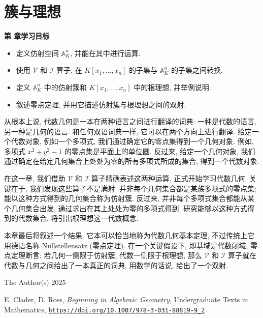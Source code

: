 \chapter{簇与理想}\label{chap:varieties-and-ideals}

\noindent\textbf{第 \thechapter{} 章学习目标}
\begin{itemize}
  \item 定义仿射空间 $\mathbb{A}^{n}_{K}$, 并能在其中进行运算.
  \item 使用 $\mathcal{V}$ 和 $\mathcal{I}$ 算子, 在 $K[x_{1},\ldots,x_{n}]$ 的子集与 $\mathbb{A}^{n}_{K}$ 的子集之间转换.
  \item 定义 $\mathbb{A}^{n}_{K}$ 中的仿射簇和 $K[x_{1},\ldots,x_{n}]$ 中的根理想, 并举例说明.
  \item 叙述零点定理, 并用它描述仿射簇与根理想之间的双射.
\end{itemize}

从根本上说, 代数几何是一本在两种语言之间进行翻译的词典: 一种是代数的语言, 另一种是几何的语言. 和任何双语词典一样, 它可以在两个方向上进行翻译. 给定一个代数对象, 例如一个多项式, 我们通过确定它的零点集得到一个几何对象. 例如, 多项式 $x^{2}+y^{2}-1$ 的零点集是平面上的单位圆. 反过来, 给定一个几何对象, 我们通过确定在给定几何集合上处处为零的所有多项式所成的集合, 得到一个代数对象.

在这一章, 我们借助 $\mathcal{V}$ 和 $\mathcal{I}$ 算子精确表述这两种运算, 正式开始学习代数几何. 关键在于, 我们发现这些算子不是满射. 并非每个几何集合都是某族多项式的零点集; 能以这种方式得到的几何集合称为仿射簇. 反过来, 并非每个多项式集合都能从某个几何集合出发, 通过求出在其上处处为零的多项式得到. 研究能够以这种方式得到的代数集合, 将引出根理想这一代数概念.

本章最后将叙述一个结果. 它本可以恰当地称为\textquotedbl{}代数几何基本定理\textquotedbl{}, 不过传统上它用德语名称 Nullstellensatz (零点定理). 在一个关键假设下, 即基域是代数闭域, 零点定理断言: 若几何一侧限于仿射簇, 代数一侧限于根理想, 那么 $\mathcal{V}$ 和 $\mathcal{I}$ 算子就在代数与几何之间给出了一本真正的词典, 用数学的话说, 给出了一个双射.

\par\smallskip
{\footnotesize
\noindent\textcopyright{} The Author(s) 2025\par
\noindent E. Clader, D. Ross, \emph{Beginning in Algebraic Geometry}, Undergraduate Texts in Mathematics,
\href{https://doi.org/10.1007/978-3-031-88819-9_2}{\nolinkurl{https://doi.org/10.1007/978-3-031-88819-9_2}}.\par}
